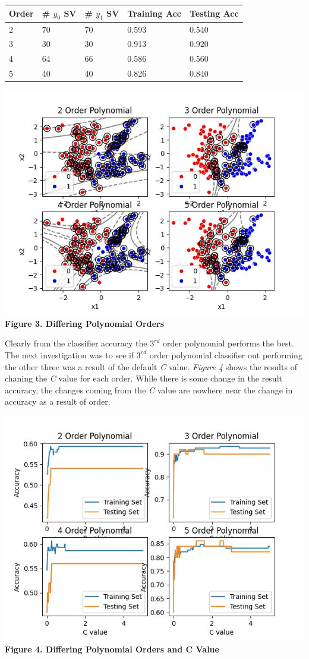 \documentclass[11pt]{article}
\begin{document}
\begin{longtable}[]{@{}lllll@{}}
\toprule
Order & \# \(y_{0}\) SV & \# \(y_{1}\) SV & Training Acc & Testing
Acc \\
\midrule
\endhead
2 & 70 & 70 & 0.593 & 0.540 \\
3 & 30 & 30 & 0.913 & 0.920 \\
4 & 64 & 66 & 0.586 & 0.560 \\
5 & 40 & 40 & 0.826 & 0.840 \\
\bottomrule
\end{longtable}

\includegraphics{figures/3_1_poly_order.jpg}\\
\textbf{Figure 3. Differing Polynomial Orders}

Clearly from the classifier accuracy the \(3^{rd}\) order polynomial
performs the best. The next investigation was to see if \(3^{rd}\) order
polynomial classifier out performing the other three was a result of the
default \emph{C} value. \emph{Figure 4} shows the results of chaning the
\emph{C} value for each order. While there is some change in the result
accuracy, the changes coming from the \emph{C} value are nowhere near
the change in accuracy as a result of order.

\includegraphics{figures/3_1_C_change_poly.jpg}\\
\textbf{Figure 4. Differing Polynomial Orders and C Value}
\end{document}
